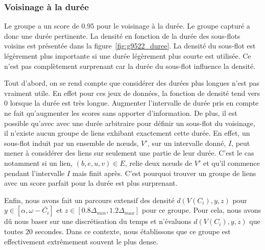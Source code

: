 \subsubsection*{Voisinage à la durée}
Le groupe a un score de $0.95$ pour le voisinage à la durée.
Le groupe capturé a donc une durée pertinente.
La densité en fonction de la durée des sous-flots voisins est présentée dans la figure~\ref{fig:g9522_duree}.
La densité du sous-flot est légèrement plus importante si une durée légèrement plus courte est utilisée.
Ce n'est pas complètement surprenant car la durée du sous-flot influence la densité.


Tout d'abord, on se rend compte que considérer des durées plus longues n'est pas vraiment utile.
En effet pour ces jeux de données, la fonction de densité tend vers $0$ lorsque la durée est très longue.
Augmenter l'intervalle de durée pris en compte ne fait qu'augmenter les scores sans apporter d'information.
De plus, il est possible qu'avec avec une durée arbitraire pour définir un sous-flot du voisinage, il n'existe aucun groupe de liens exhibant exactement cette durée.
En effet, un sous-flot induit par un ensemble de n\oe{}uds, $V'$, sur un intervalle donné, $I$, peut mener à considérer des liens sur seulement une partie de leur durée.
C'est le cas notamment si un lien, $(b,e,u,v) \in E$, relie deux n\oe{}uds de $V'$ et qu'il commence pendant l'intervalle $I$ mais finit après.
C'est pourquoi trouver un groupe de liens avec un score parfait pour la durée est plus surprenant.

\bigskip

Enfin, nous avons fait un parcours extensif des densité $d(V(C_i),y,z)$ pour $y \in [\alpha, \omega - \bar{C_i}]$ et $z \in [0.8\Delta_{min}, 1.2\Delta_{max}]$ pour ce groupe.
Pour cela, nous avons dû nous baser sur une discrétisation du temps et n'évaluons $d(V(C_i),y,z)$ que toutes $20$ secondes.
Dans ce contexte, nous établissons que ce groupe est effectivement extrêmement souvent le plus dense.

